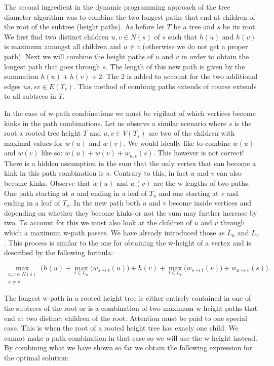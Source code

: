 The second ingredient in the dynamic programming approach of the tree diameter algorithm was to combine the two longest paths that end at children of the root of the subtree (height paths). As before let $T$ be a tree and $s$ be its root. We first find two distinct children $u, v \in N(s)$ of $s$ such that $h(u)$ and $h(v)$ is maximum amongst all children and $u \ne v$ (otherwise we do not get a proper path). Next we will combine the height paths of $u$ and $v$ in order to obtain the longest path that goes through $s$. The length of this new path is given by the summation $h(u) + h(v) + 2$. The $2$ is added to account for the two additional edges $us, sv \in E(T_s)$. This method of combinig paths extends of course extends to all subtrees in $T$.

In the case of w-path combinations we must be vigilant of which vertices become kinks in the path combinations. Let us observe a similar scenario where $s$ is the root a rooted tree height $T$ and $u, v \in V(T_s)$ are two of the children with maximal values for $w(u)$ and $w(v)$. We would ideally like to combine $w(u)$ and $w(v)$ like so: $w(u) + w(v) + w_{u, v}(s)$. This however is not correct! There is a hidden assumption in the sum that the only vertex that can become a kink in this path combination is $s$. Contrary to this, in fact $u$ and $v$ can also become kinks. Observe that $w(u) \text{ and } w(v)$ are the w-lengths of two paths. One path starting at $u$ and ending in a leaf of $T_u$ and one starting at $v$ and ending in a leaf of $T_v$. In the new path both $u$ and $v$ become inside vertices and depending on whether they become kinks or not the sum may further increase by two. To account for this we must also look at the children of $u$ and $v$ through which a maximum w-path passes. We have already introduced those as $L_u$ and $L_v$. This process is similar to the one for obtaining the w-height of a vertex and is described by the following formula:

$$ \max\limits_{\substack{u, v \in N(s) \\ u \ne v}}\bigg( h(u) + \max\limits_{t \in L_u}\Big(w_{s \rightsquigarrow t}(u)\Big) + h(v) + \max\limits_{t \in L_v}\Big(w_{s \rightsquigarrow t}(v)\Big) + w_{u \rightsquigarrow v}(s)\bigg). $$



The longest w-path in a rooted height tree is either entirely contained in one of the subtrees of the root or is a combination of two maximum w-height paths that end at two distinct children of the root. Attention must be paid to one special case. This is when the root of a rooted height tree has exacly one child. We cannot make a path combination in that case so we will use the w-height instead. By combining what we have shown so far we obtain the following expression for the optimal solution:

